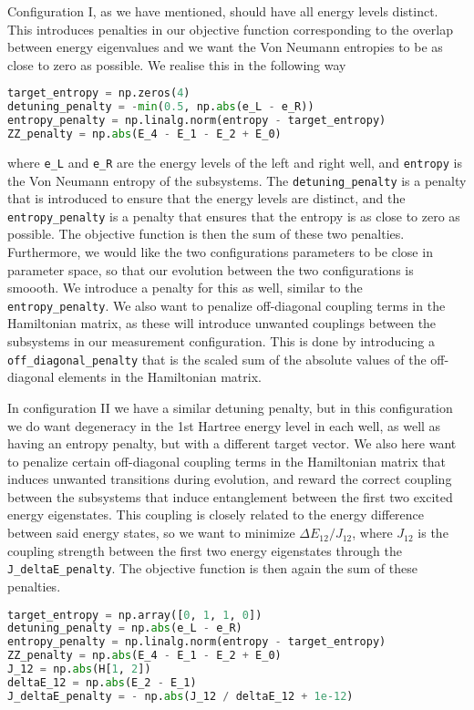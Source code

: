 \documentclass{subfiles}
\begin{document}
Configuration I, as we have mentioned, should have all energy levels distinct. This introduces penalties in our objective function corresponding to the overlap between energy eigenvalues and we want the Von Neumann entropies to be as close to zero as possible. We realise this in the following way
\begin{lstlisting}[language=Python]
target_entropy = np.zeros(4)
detuning_penalty = -min(0.5, np.abs(e_L - e_R))
entropy_penalty = np.linalg.norm(entropy - target_entropy)
ZZ_penalty = np.abs(E_4 - E_1 - E_2 + E_0)
\end{lstlisting}
where \texttt{e\_L} and \texttt{e\_R} are the energy levels of the left and right well, and \texttt{entropy} is the Von Neumann entropy of the subsystems. The \texttt{detuning\_penalty} is a penalty that is introduced to ensure that the energy levels are distinct, and the \texttt{entropy\_penalty} is a penalty that ensures that the entropy is as close to zero as possible. The objective function is then the sum of these two penalties. Furthermore, we would like the two configurations parameters to be close in parameter space, so that our evolution between the two configurations is smoooth. We introduce a penalty for this as well, similar to the \texttt{entropy\_penalty}. We also want to penalize off-diagonal coupling terms in the Hamiltonian matrix, as these will introduce unwanted couplings between the subsystems in our measurement configuration. This is done by introducing a \texttt{off\_diagonal\_penalty} that is the scaled sum of the absolute values of the off-diagonal elements in the Hamiltonian matrix.

In configuration II we have a similar detuning penalty, but in this configuration we do want degeneracy in the 1st Hartree energy level in each well, as well as having an entropy penalty, but with a different target vector. We also here want to penalize certain off-diagonal coupling terms in the Hamiltonian matrix that induces unwanted transitions during evolution, and reward the correct coupling between the subsystems that induce entanglement between the first two excited energy eigenstates. This coupling is closely related to the energy difference between said energy states, so we want to minimize $\Delta E_{12} / J_{12}$, where $J_{12}$ is the coupling strength between the first two energy eigenstates through the \texttt{J\_deltaE\_penalty}. 
The objective function is then again the sum of these penalties.
\begin{lstlisting}[language=Python]
target_entropy = np.array([0, 1, 1, 0])
detuning_penalty = np.abs(e_L - e_R)
entropy_penalty = np.linalg.norm(entropy - target_entropy)
ZZ_penalty = np.abs(E_4 - E_1 - E_2 + E_0)
J_12 = np.abs(H[1, 2])  
deltaE_12 = np.abs(E_2 - E_1)  
J_deltaE_penalty = - np.abs(J_12 / deltaE_12 + 1e-12)  
\end{lstlisting}
\end{document}
